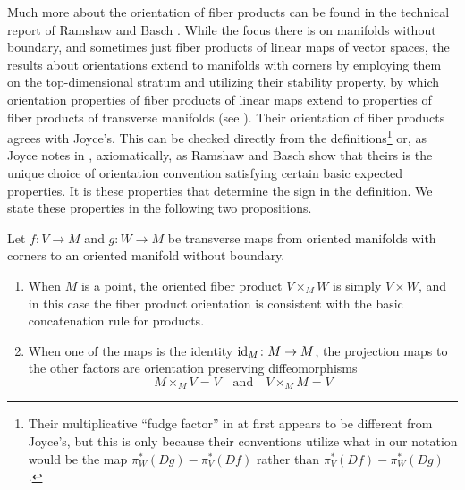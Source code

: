 Much more about the orientation of fiber products can be found in the technical report of Ramshaw and Basch \cite{RamBas09}.
While the focus there is on manifolds without boundary, and sometimes just fiber products of linear maps of vector spaces, the results about orientations extend to manifolds with corners by employing them on the top-dimensional stratum and utilizing their stability property, by which orientation properties of fiber products of linear maps extend to properties of fiber products of transverse manifolds (see \cite[Sections 6.3, 9.1.2, and 9.3]{RamBas09}).
Their orientation of fiber products agrees with Joyce's.
This can be checked directly from the definitions\footnote{Their multiplicative ``fudge factor'' in \cite[Theorem 9.14]{RamBas09} at first appears to be different from Joyce's, but this is only because their conventions utilize what in our notation would be the map $\pi_W^*(Dg)-\pi_V^*(Df)$ rather than $\pi_V^*(Df)-\pi_W^*(Dg)$.} or, as Joyce notes in \cite[Remark 7.6.iii]{Joy12}, axiomatically, as Ramshaw and Basch show that theirs is the unique choice of orientation convention satisfying certain basic expected properties.
It is these properties that determine the sign in the definition.
We state these properties in the following two propositions.

\begin{proposition}\label{P: oriented fiber product basic properties}
	Let $f \colon V\to M$ and $g \colon W\to M$ be transverse maps from oriented manifolds with corners to an oriented manifold without boundary.
	\begin{enumerate}
		\item When $M$ is a point, the oriented fiber product $V\times_M W$ is simply $V\times W$, and in this case the fiber product orientation is consistent with the basic concatenation rule for products.
		\item When one of the maps is the identity $\mathrm{id}_M \colon M\to M$, the projection maps to the other factors are orientation preserving diffeomorphisms
		\begin{equation*}
			M\times_M V=V\quad\text{and}\quad V\times_MM=V
		\end{equation*}
	\end{enumerate}
\end{proposition}

